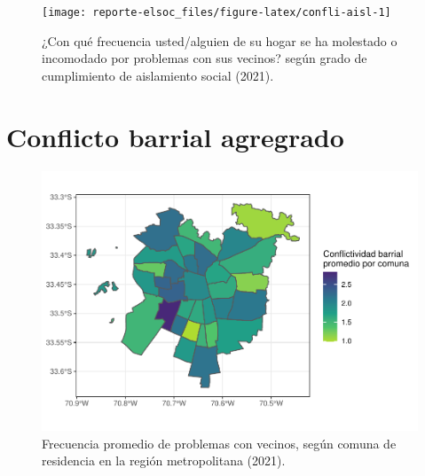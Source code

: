 \documentclass[
  12pt,
  openany]{book}
\begin{document}
\begin{figure}

{\centering \texttt{[image: reporte-elsoc\_files/figure-latex/confli-aisl-1]} 

}

\caption{¿Con qué frecuencia usted/alguien de su hogar se ha molestado o incomodado por problemas con sus vecinos? según grado de cumplimiento de aislamiento social (2021).}\label{fig:confli-aisl}
\end{figure}

\hypertarget{conflicto-barrial-agregrado}{%
\section{Conflicto barrial agregrado}\label{conflicto-barrial-agregrado}}

\begin{figure}

{\centering \includegraphics{reporte-elsoc_files/figure-latex/confli-comuna-1} 

}

\caption{Frecuencia promedio de problemas con vecinos, según comuna de residencia en la región metropolitana (2021).}\label{fig:confli-comuna}
\end{figure}
\end{document}
